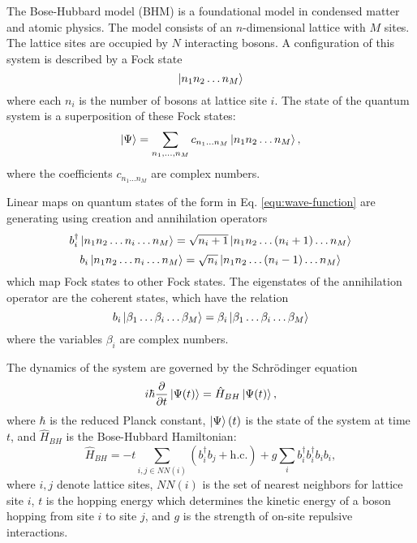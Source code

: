 \documentclass{article}
\newcommand{\Schroedinger}{Schr{\"o}dinger}
\begin{document}
The Bose-Hubbard model (BHM) is a foundational model in condensed matter and atomic physics. 
The model consists of an \(n\)-dimensional lattice with \(M\) sites. The lattice sites 
are occupied by \(N\) interacting bosons. A configuration of this system is described by a Fock state
\begin{equation}
    \label{equ:fock-state}
    \ket{n_1 n_2 \ldots n_M}
\end{equation}
where each \(n_i\) is the number of bosons at lattice site \(i\). The state of the quantum system is a 
superposition of these Fock states:
\begin{equation}
    \label{equ:wave-function}
    \ket{\Psi} = \sum_{n_1, \ldots, n_M} c_{n_1 \ldots n_M} \ket{n_1 n_2 \ldots n_M},
\end{equation}
where the coefficients \(c_{n_1 \ldots n_M}\) are complex numbers. 

Linear maps on quantum states of the form in Eq. \ref{equ:wave-function} are generating 
using creation and annihilation operators
\begin{equation}
    b_i^\dagger \ket{n_1 n_2 \ldots n_i \ldots n_M} = \sqrt{n_i + 1} \ket{n_1 n_2 \ldots (n_i + 1) \ldots n_M}
\end{equation}
\begin{equation}
    b_i \ket{n_1 n_2 \ldots n_i \ldots n_M} = \sqrt{n_i} \ket{n_1 n_2 \ldots (n_i - 1) \ldots n_M}
\end{equation}
which map Fock states to other Fock states. The eigenstates of the annihilation operator 
are the coherent states, which have the relation
\begin{equation}
    \label{equ:coherent-state}
    b_i \ket{\beta_1 \ldots \beta_i \ldots \beta_M} = \beta_i \ket{\beta_1 \ldots \beta_i \ldots \beta_M}
\end{equation}
where the variables \(\beta_i\) are complex numbers. 

The dynamics of the system are governed by the \Schroedinger{} equation 
\begin{equation}
    \label{equ:schroedinger}
    i \hbar \frac{\partial}{\partial t} \ket{\Psi(t)} = \hat{H}_{BH} \ket{\Psi(t)},
\end{equation}
where \(\hbar\) is the reduced Planck constant, \(\ket{\Psi}(t)\) is the state of the system at time \(t\),
and \(\hat{H}_{BH}\) is the Bose-Hubbard Hamiltonian:
\begin{equation}
    \hat{H}_{BH} = -t \sum_{i,j \in NN(i)} (b_i^\dagger b_j + \textrm{h.c.}) + g \sum_i b_i^\dagger b_i^\dagger b_i b_i,
\end{equation}
where \(i,j\) denote lattice sites, \(NN(i)\) is the set of nearest neighbors for lattice site \(i\), \(t\) is the hopping
energy which determines the kinetic energy of a boson hopping from site \(i\) to site \(j\), and \(g\) is the strength 
of on-site repulsive interactions.
\end{document}
